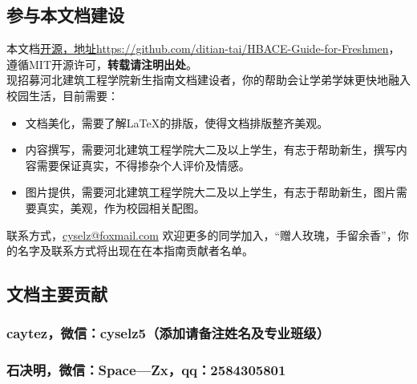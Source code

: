 \documentclass[12pt]{article} %
\begin{document}
\subsection*{参与本文档建设}
本文档\href{https://github.com/ditian-tai/HBACE-Guide-for-Freshmen}{开源，地址https://github.com/ditian-tai/HBACE-Guide-for-Freshmen}，遵循MIT开源许可，\textbf{转载请注明出处}。\\

现招募河北建筑工程学院新生指南文档建设者，你的帮助会让学弟学妹更快地融入校园生活，目前需要：
\begin{itemize}
	\item 文档美化，需要了解\LaTeX 的排版，使得文档排版整齐美观。
	\item 内容撰写，需要河北建筑工程学院大二及以上学生，有志于帮助新生，撰写内容需要保证真实，不得掺杂个人评价及情感。
	\item 图片提供，需要河北建筑工程学院大二及以上学生，有志于帮助新生，图片需要真实，美观，作为校园相关配图。
\end{itemize}

联系方式，\href{mailto:cyselz@foxmail.com}{cyselz@foxmail.com}
欢迎更多的同学加入，“赠人玫瑰，手留余香”，你的名字及联系方式将出现在在本指南贡献者名单。

\subsection*{文档主要贡献} 
\subsubsection*{caytez，微信：cyselz5（添加请备注姓名及专业班级）}
\subsubsection*{石决明，微信：Space---Zx，qq：2584305801}
\end{document}
